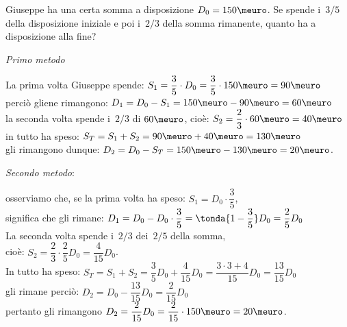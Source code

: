 \begin{esempio}{}{}
Giuseppe ha una certa somma a disposizione \(D_0 = 150\meuro\). 
Se spende i~\(3/5\) della disposizione 
iniziale e poi i~\(2/3\) della somma rimanente, 
quanto ha a disposizione alla fine?

\vspace{.5em}
\emph{Primo metodo} 

La prima volta Giuseppe spende: \quad 
\(S_1 = \dfrac{3}{5} \cdot D_0 =
  \dfrac{3}{5} \cdot 150\meuro = 90\meuro\)\\
perciò gliene rimangono: \quad 
\(D_1 = D_0 - S_1 = 150\meuro - 90\meuro = 60\meuro\) \\
la seconda volta spende i~\(2/3\) di \(60\meuro\), 
cioè: \quad \(S_2 = \dfrac{2}{3} \cdot 60\meuro = 40\meuro\) \\
in tutto ha speso: \quad 
\(S_T = S_1 + S_2 = 90\meuro + 40\meuro = 130\meuro\)\\
gli rimangono dunque: \quad 
\(D_2 = D_0 - S_T = 150\meuro - 130\meuro = 20\meuro\).

\vspace{.5em}
\emph{Secondo metodo}: 

osserviamo che,
se la prima volta ha speso: \quad 
\(S_1 = D_0 \cdot \dfrac{3}{5}\),\\
significa che gli rimane: \quad 
\(D_1 = D_0 - D_0 \cdot \dfrac{3}{5} = 
  \tonda{1-\dfrac{3}{5}} D_0 = \dfrac{2}{5} D_0\) \\ 
La seconda volta spende i~\({2}/{3}\) dei~\({2}/{5}\) della somma, \\
cioè: \quad 
\(S_2 = \dfrac{2}{3} \cdot \dfrac{2}{5} D_0 = \dfrac{4}{15} D_0\).\\
In tutto ha speso: \quad 
\(S_T = S_1 + S_2 = \dfrac{3}{5} D_0 + \dfrac{4}{15} D_0 =
  \dfrac{3\cdot3+4}{15} D_0 =\dfrac{13}{15} D_0\) \\
gli rimane perciò: \quad 
\(D_2 = D_0 - \dfrac{13}{15} D_0 = \dfrac{2}{15} D_0\) \\ 
pertanto gli rimangono \quad 
\(D_2 = \dfrac{2}{15} D_0 = \dfrac{2}{15} \cdot 150\meuro= 20 \meuro\).
\end{esempio}


